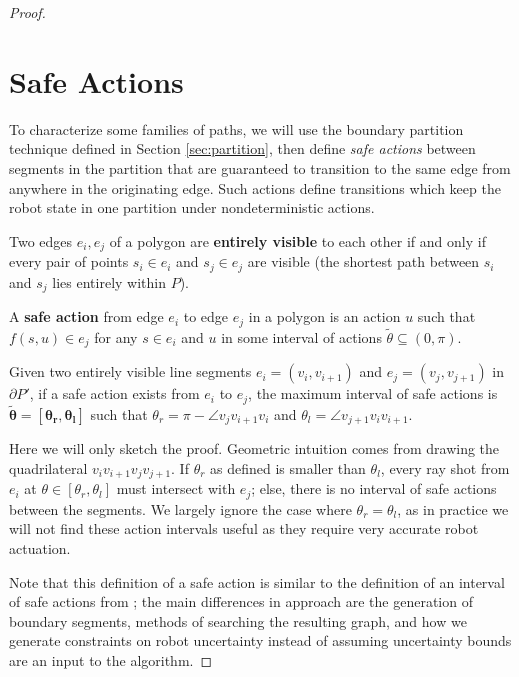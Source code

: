 \documentclass[]{styles/svproc}  %
\begin{document}
\begin{proof}
\section{Safe Actions} \label{sec:safe}

To characterize some families of paths, we will use the boundary
partition technique defined in Section \ref{sec:partition}, then define
\emph{safe actions} between segments in the partition that are
guaranteed to transition to the same edge from anywhere in the
originating edge. Such actions define transitions which keep the
robot state in one partition under nondeterministic actions.

\begin{definition}
Two edges $e_i,e_j$ of a polygon are \textbf{entirely visible} to each other if
and only if every pair of points $s_i \in e_i$ and $s_j \in e_j$ are visible (the
shortest path between $s_i$ and $s_j$ lies entirely within $P$).
\end{definition}

\begin{definition} \label{def:sa}
A \textbf{safe action} from edge $e_i$ to edge $e_j$ in a polygon is an 
action $u$ such
that $f(s,u) \in e_j$ for any $s \in e_i$ and $u$ in some interval of actions
$\tilde{\theta} \subseteq (0,\pi)$.
\end{definition}

\begin{proposition} \label{prop:saferange}
Given two entirely visible line segments $e_i = (v_i, v_{i+1})$ and $e_j =
(v_j, v_{j+1})$ in $\partial P'$, if a safe action
exists from $e_i$ to $e_j$, the maximum interval of safe actions is $\bm{\tilde{\theta} = [\theta_r, \theta_l]}$ such
that $\theta_r = \pi - \angle v_j v_{i+1} v_i$ and $\theta_l = \angle v_{j+1}
v_i v_{i+1}$.
\end{proposition}

Here we will only sketch the proof. Geometric intuition comes from drawing the
quadrilateral $v_i v_{i+1} v_j v_{j+1}$. If $\theta_r$ as
defined is smaller than $\theta_l$, every ray shot from $e_i$ at $\theta \in [\theta_r,
\theta_l]$ must intersect with $e_j$; else, there is no interval of safe actions
between the segments. We largely ignore the case where $\theta_r = \theta_l$, as
in practice we will not find these action intervals useful as they require very
accurate robot actuation.

Note that this definition of a safe action is similar to the definition of an interval of
safe actions from \cite{LewOKa13}; the main differences in approach are the
generation of boundary segments, methods of searching the resulting graph, and
how we generate constraints on robot uncertainty instead of assuming uncertainty
bounds are an input to the algorithm.


\end{proof}
\end{document}
